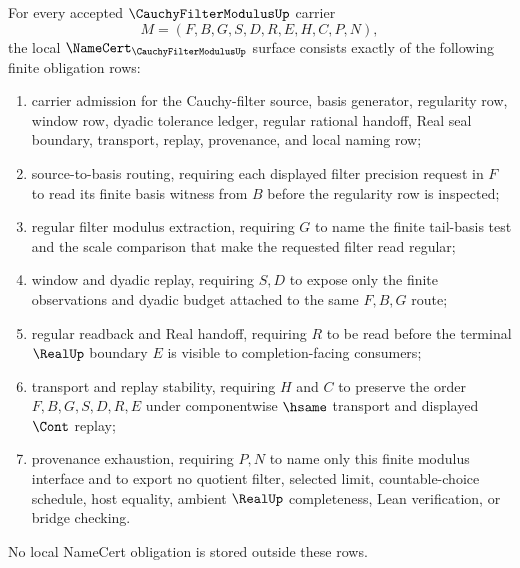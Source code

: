 \begin{theorem}
\label{thm:cauchy-filter-modulus-namecert-obligations}
For every accepted $\CauchyFilterModulusUp$ carrier
$$
M=(F,B,G,S,D,R,E,H,C,P,N),
$$
the local $\NameCert_{\CauchyFilterModulusUp}$ surface consists exactly of the following finite obligation rows:
\begin{enumerate}
\item carrier admission for the Cauchy-filter source, basis generator, regularity row, window row, dyadic tolerance ledger, regular rational handoff, Real seal boundary, transport, replay, provenance, and local naming row;
\item source-to-basis routing, requiring each displayed filter precision request in $F$ to read its finite basis witness from $B$ before the regularity row is inspected;
\item regular filter modulus extraction, requiring $G$ to name the finite tail-basis test and the scale comparison that make the requested filter read regular;
\item window and dyadic replay, requiring $S,D$ to expose only the finite observations and dyadic budget attached to the same $F,B,G$ route;
\item regular readback and Real handoff, requiring $R$ to be read before the terminal $\RealUp$ boundary $E$ is visible to completion-facing consumers;
\item transport and replay stability, requiring $H$ and $C$ to preserve the order $F,B,G,S,D,R,E$ under componentwise $\hsame$ transport and displayed $\Cont$ replay;
\item provenance exhaustion, requiring $P,N$ to name only this finite modulus interface and to export no quotient filter, selected limit, countable-choice schedule, host equality, ambient $\RealUp$ completeness, Lean verification, or bridge checking.
\end{enumerate}
No local NameCert obligation is stored outside these rows.
\end{theorem}
